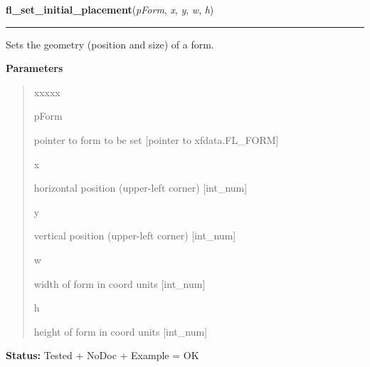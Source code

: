 \hspace{.8\funcindent}\begin{boxedminipage}{\funcwidth}

    \raggedright \textbf{fl\_set\_initial\_placement}(\textit{pForm}, \textit{x}, \textit{y}, \textit{w}, \textit{h})

    \vspace{-1.5ex}

    \rule{\textwidth}{0.5\fboxrule}
\setlength{\parskip}{2ex}
    Sets the geometry (position and size) of a form.

\setlength{\parskip}{1ex}
      \textbf{Parameters}
      \vspace{-1ex}

      \begin{quote}
        \begin{Ventry}{xxxxx}

          \item[pForm]

          pointer to form to be set [pointer to xfdata.FL\_FORM]

          \item[x]

          horizontal position (upper-left corner) [int\_num]

          \item[y]

          vertical position (upper-left corner) [int\_num]

          \item[w]

          width of form in coord units [int\_num]

          \item[h]

          height of form in coord units [int\_num]

        \end{Ventry}

      \end{quote}

\textbf{Status:} Tested + NoDoc + Example = OK



    \end{boxedminipage}

    \label{xformslib:library:fl_show_form}

    \vspace{0.5ex}

